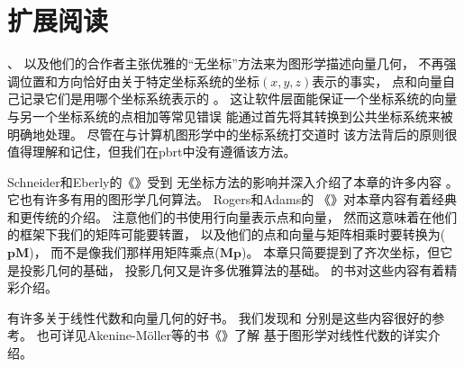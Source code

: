 \section{扩展阅读}\label{sec:扩展阅读2}
\citeauthor{10.1007/978-3-642-61542-9_19}、\citeauthor{10.1145/282957.282969}
以及他们的合作者主张优雅的“无坐标”方法来为图形学描述向量几何，
不再强调位置和方向恰好由关于特定坐标系统的坐标$(x,y,z)$表示的事实，
点和向量自己记录它们是用哪个坐标系统表示的
\citep{10.1145/282957.282969,10.1007/978-3-642-61542-9_19,Mann97acoordinate}。
这让软件层面能保证一个坐标系统的向量与另一个坐标系统的点相加等常见错误
能通过首先将其转换到公共坐标系统来被明确地处理。
尽管在与计算机图形学中的坐标系统打交道时
该方法背后的原则很值得理解和记住，但我们在pbrt中没有遵循该方法。

Schneider和Eberly的《》受到
无坐标方法的影响并深入介绍了本章的许多内容\citep{10.5555/2821579}
。
它也有许多有用的图形学几何算法。
Rogers和Adams\parencite*{10.5555/63448}的
《》对本章内容有着经典和更传统的介绍。
注意他们的书使用行向量表示点和向量，
然而这意味着在他们的框架下我们的矩阵可能要转置，
以及他们的点和向量与矩阵相乘时要转换为($\bm p\bm M$)，
而不是像我们那样用矩阵乘点($\bm M\bm p$)。
本章只简要提到了齐次坐标，但它是投影几何的基础，
投影几何又是许多优雅算法的基础。
\citeauthor{10.5555/113163}的书对这些内容有着精彩介绍\citep{10.5555/113163}。

有许多关于线性代数和向量几何的好书。
我们发现\citet{lang2012introduction}和\citet{buck1956advanced}
分别是这些内容很好的参考。
也可详见Akenine-Möller等的书《》\parencite*{10.5555/2829183}了解
基于图形学对线性代数的详实介绍。

